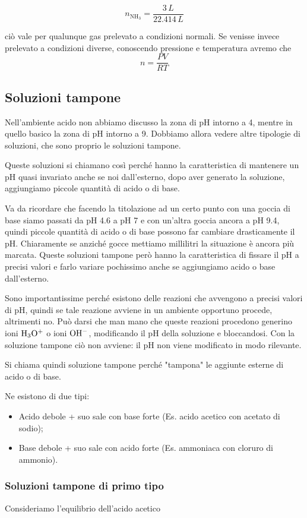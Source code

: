 $$n_{\text{NH}_3}=\frac{3 \, L}{22.414 \, L}$$

ciò vale per qualunque gas prelevato a condizioni normali. Se venisse invece prelevato a condizioni diverse, conoscendo pressione e temperatura avremo che
$$n=\frac{PV}{RT}$$
\subsection{Soluzioni tampone}
Nell'ambiente acido non abbiamo discusso la zona di pH intorno a 4, mentre in quello basico la zona di pH intorno a 9. Dobbiamo allora vedere altre tipologie di soluzioni, che sono proprio le soluzioni tampone.

Queste soluzioni si chiamano così perché hanno la caratteristica di mantenere un pH quasi invariato anche se noi dall'esterno, dopo aver generato la soluzione, aggiungiamo piccole quantità di acido o di base.

Va da ricordare che facendo la titolazione ad un certo punto con una goccia di base siamo passati da pH 4.6 a pH 7 e con un'altra goccia ancora a pH 9.4, quindi piccole quantità di acido o di base possono far cambiare drasticamente il pH. Chiaramente se anziché gocce mettiamo millilitri la situazione è ancora più marcata. Queste soluzioni tampone però hanno la caratteristica di fissare il pH a precisi valori e farlo variare pochissimo anche se aggiungiamo acido o base dall'esterno.

Sono importantissime perché esistono delle reazioni che avvengono a precisi valori di pH, quindi se tale reazione avviene in un ambiente opportuno procede, altrimenti no. Può darsi che man mano che queste reazioni procedono generino ioni $\rm H_3O^+$ o ioni $\rm OH^-$, modificando il pH della soluzione e bloccandosi. Con la soluzione tampone ciò non avviene: il pH non viene modificato in modo rilevante.

Si chiama quindi soluzione tampone perché "tampona" le aggiunte esterne di acido o di base.

Ne esistono di due tipi:

\begin{itemize}
    \item Acido debole + suo sale con base forte
    (Es. acido acetico con acetato di sodio);
    \item Base debole + suo sale con acido forte
    (Es. ammoniaca con cloruro di ammonio).
\end{itemize}

\subsubsection{Soluzioni tampone di primo tipo}
Consideriamo l'equilibrio dell'acido acetico

